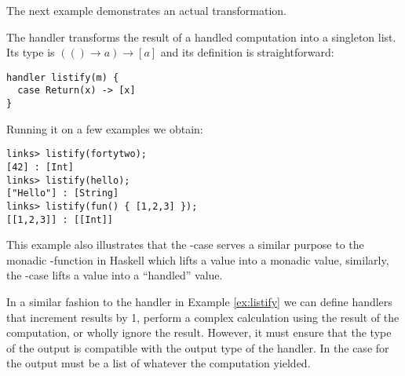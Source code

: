 The next example demonstrates an actual transformation.
\begin{example}\label{ex:listify}
The  handler transforms the result of a handled computation into a singleton list. Its type is $ (() \to a) \to [a]$ and its definition is straightforward:
\begin{lstlisting}[style=links]
handler listify(m) {
  case Return(x) -> [x]
}
\end{lstlisting}
Running it on a few examples we obtain:
\begin{lstlisting}[style=links]
links> listify(fortytwo);
[42] : [Int]
links> listify(hello);
["Hello"] : [String]
links> listify(fun() { [1,2,3] });
[[1,2,3]] : [[Int]]
\end{lstlisting}
This example also illustrates that the -case serves a similar purpose to the monadic -function in Haskell which lifts a value into a monadic value, similarly, the -case lifts a value into a ``handled'' value.
\end{example}

In a similar fashion to the handler  in Example \ref{ex:listify} we can define handlers that increment results by 1, perform a complex calculation using the result of the computation, or wholly ignore the result. However, it must ensure that the type of the output is compatible with the output type of the handler. In the case for  the output must be a list of whatever the computation yielded.

